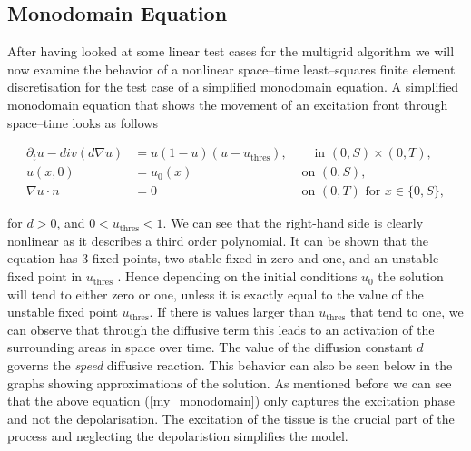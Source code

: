 \documentclass[../draft_1.tex]{subfiles}
\begin{document}
\FloatBarrier
\subsection{Monodomain Equation}

After having looked at some linear test cases for the multigrid algorithm we will now examine the behavior of a nonlinear space--time least--squares finite element discretisation for the test case of a simplified monodomain equation. A simplified monodomain equation that shows the movement of an excitation front through space--time looks as follows

\begin{ceqn}
	\begin{equation}
	\begin{aligned}
	\label{my_monodomain}
	\partial_t u - div(d \nabla u) &= u (1 - u ) (u - u_{\text{thres}}), &\quad \text{ in } (0, S) \times (0,T),\\
	u(x, 0) &= u_0(x) &\text{ on } (0,S), \\
	\nabla u \cdot n &= 0 \qquad &\text{ on } (0, T) \text{ for } x \in \{0,S\},
	\end{aligned}
	\end{equation}
\end{ceqn}
for $d > 0$, and  $0 < u_{\text{thres}}  < 1$. We can see that the right-hand side is clearly nonlinear as it describes a third order polynomial. It can be shown that the equation has 3 fixed points, two stable fixed in zero and one, and an unstable fixed point in $u_{\text{thres}}$ \cite{deuflhard2011adaptive}. Hence depending on the initial conditions $u_0$ the solution will tend to either zero or one, unless it is exactly equal to the value of the unstable fixed point $u_{\text{thres}}$. If there is values larger than $u_{\text{thres}}$ that tend to one, we can observe that through the diffusive term this leads to an activation of the surrounding areas in space over time. The value of the diffusion constant $d$ governs the \textit{speed} diffusive reaction. This behavior can also be seen below in the graphs showing approximations of the solution. As mentioned before we can see that the above equation (\ref{my_monodomain}) only captures the excitation phase and not the depolarisation. The excitation of the tissue is the crucial part of the process and neglecting the depolaristion simplifies the model. 
\end{document}
